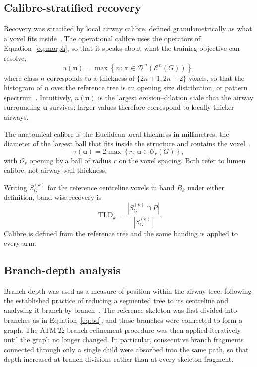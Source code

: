 \subsection{Calibre-stratified recovery}
\label{sec:methods-calibre}

Recovery was stratified by local airway calibre, defined granulometrically as what a voxel fits
inside~\cite{matheron1975randomsets,serra1982morphology}. The operational calibre uses the
operators of Equation~\eqref{eq:morph}, so that it speaks about what the training objective can
resolve,
\begin{equation}
  n(\mathbf{u})=\max\left\{n:\ \mathbf{u}\in\mathcal{D}^{\,n}\!\left(\mathcal{E}^{\,n}(G)\right)\right\},
  \label{eq:opclass}
\end{equation}
where class $n$ corresponds to a thickness of $\{2n+1,2n+2\}$ voxels, so that the histogram of
$n$ over the reference tree is an opening size distribution, or pattern
spectrum~\cite{maragos1989patternspectrum,soille2003morphology}.
Intuitively, $n(\mathbf{u})$ is the largest erosion--dilation scale that the airway
surrounding $\mathbf{u}$ survives; larger values therefore correspond to locally thicker
airways.

The anatomical calibre is the Euclidean local thickness in millimetres, the diameter of the
largest ball that fits inside the structure and contains the
voxel~\cite{hildebrand1997thickness,dougherty2007localthickness},
\begin{equation}
  \tau(\mathbf{u})=2\max\left\{r:\ \mathbf{u}\in\mathcal{O}_{r}(G)\right\},
  \label{eq:mmthickness}
\end{equation}
with $\mathcal{O}_r$ opening by a ball of radius $r$ on the voxel spacing. Both refer to lumen
calibre, not airway-wall thickness.

Writing $S_G^{(k)}$ for the reference centreline voxels in
band $B_k$ under either definition, band-wise recovery is
\begin{equation}
  \operatorname{TLD}_k=\frac{\left|S_G^{(k)}\cap P\right|}{\left|S_G^{(k)}\right|}.
  \label{eq:tldband}
\end{equation}
Calibre is defined from the reference tree and the same banding is applied to every arm.

\subsection{Branch-depth analysis}
\label{sec:methods-depth}

Branch depth was used as a measure of position within the airway tree, following the
established practice of reducing a segmented tree to its centreline and analysing it branch by
branch~\cite{tschirren2005airway,palagyi2006airway}. The reference
skeleton was first divided into branches as in Equation~\eqref{eq:bd}, and these branches
were connected to form a graph. The ATM'22 branch-refinement procedure was then applied
iteratively until the graph no longer changed. In particular, consecutive branch fragments
connected through only a single child were absorbed into the same path, so that depth
increased at branch divisions rather than at every skeleton fragment.

